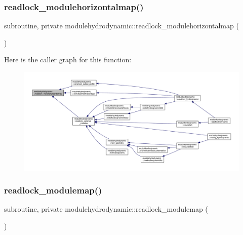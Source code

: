 \subsubsection{\texorpdfstring{readlock\+\_\+modulehorizontalmap()}{readlock\_modulehorizontalmap()}}
{\footnotesize\ttfamily subroutine, private modulehydrodynamic\+::readlock\+\_\+modulehorizontalmap (\begin{DoxyParamCaption}{ }\end{DoxyParamCaption})\hspace{0.3cm}{\ttfamily [private]}}

Here is the caller graph for this function\+:\nopagebreak
\begin{figure}[H]
\begin{center}
\leavevmode
\includegraphics[width=350pt]{namespacemodulehydrodynamic_a2b7951ef8d3385a7141d22cbca764a93_icgraph}
\end{center}
\end{figure}
\mbox{\label{namespacemodulehydrodynamic_aefa0a7b600df8e249667d3541b45ecf1}} 
\subsubsection{\texorpdfstring{readlock\+\_\+modulemap()}{readlock\_modulemap()}}
{\footnotesize\ttfamily subroutine, private modulehydrodynamic\+::readlock\+\_\+modulemap (\begin{DoxyParamCaption}{ }\end{DoxyParamCaption})\hspace{0.3cm}{\ttfamily [private]}}

